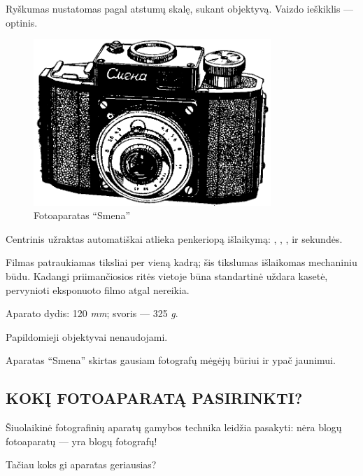 \documentclass[12pt]{book}
\begin{document}
			Ryškumas nustatomas pagal atstumų skalę, sukant objektyvą. Vaizdo ieškiklis --- optinis.
			\begin{figure}[!h]
				\centering
				\includegraphics[width=0.8\textwidth]{25-pav}
				\caption{Fotoaparatas ``Smena''}
				\label{fig:25}
			\end{figure}

			Centrinis užraktas automatiškai atlieka penkeriopą išlaikymą: , , ,  ir  sekundės.

			Filmas patraukiamas tiksliai per vieną kadrą; šis tikslumas išlaikomas mechaniniu būdu. Kadangi priimančiosios ritės vietoje būna standartinė uždara kasetė, pervynioti eksponuoto filmo atgal nereikia.

			Aparato dydis: 120   \textit{mm}; svoris --- 325 \textit{g}.

			Papildomieji objektyvai nenaudojami.

			Aparatas ``Smena'' skirtas gausiam fotografų mėgėjų būriui ir ypač jaunimui.
		\subsection*{KOKĮ FOTOAPARATĄ PASIRINKTI?}
			Šiuolaikinė fotografinių aparatų gamybos technika leidžia pasakyti: nėra blogų fotoaparatų --- yra blogų fotografų!

			Tačiau koks gi aparatas geriausias?
\end{document}
